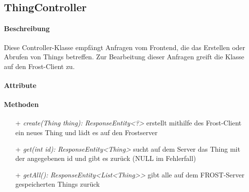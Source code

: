 \subsection{ThingController}

\paragraph{Beschreibung}
Diese Controller-Klasse empfängt Anfragen vom Frontend, die das Erstellen oder Abrufen von Things betreffen. Zur Bearbeitung dieser Anfragen greift die Klasse auf den Frost-Client zu.


\paragraph{Attribute}

\paragraph{Methoden}
\begin{itemize}
\item[+] \textit{ create(Thing thing): ResponseEntity<?> }
erstellt mithilfe des Frost-Client ein neues Thing und lädt es auf den Frostserver
\item[+] \textit{get(int id): ResponseEntity<Thing>}
sucht auf dem Server das Thing mit der angegebenen id und gibt es zurück (NULL im Fehlerfall)
\item[+] \textit{getAll(): ResponseEntity<List<Thing>>}
gibt alle auf dem FROST-Server gespeicherten Things zurück
\end{itemize}